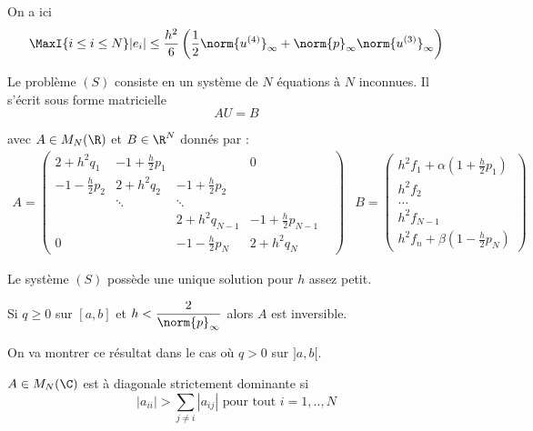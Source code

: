     \begin{remark}
        On a ici 
        \[
            \MaxI{i\leq i \leq N} |e_i| \leq \dfrac{h^2}{6} \left( \frac{1}{2}
            \norm{u^{(4)}}_\infty + \norm{p}_\infty \norm{u^{(3)}}_\infty \right)
        \]

        Le problème $(S)$ consiste en un système de $N$ équations à $N$ inconnues. Il s'écrit sous forme matricielle
        \[
            AU = B
        \]
        
        avec $A \in M_N(\R)$ et $B \in \R^N$ donnés par :
        \[
            \begin{array}{cc}
                A =
                \begin{pmatrix}
                    2 + h^2 q_1 & -1 + \frac{h}{2}p_1 & & 0\\
                    -1 - \frac{h}{2}p_2 & 2 + h^2 q_2 & -1 + \frac{h}{2}p_2 & \\
                    & \ddots & \ddots & & \\
                    & & 2 + h^2 q_{N-1} & -1 + \frac{h}{2}p_{N-1} \\
                    0 & & -1 - \frac{h}{2}p_N & 2 + h^2 q_N
                \end{pmatrix}
                &
                B =
                \begin{pmatrix}
                    h^2 f_1 + \alpha (1 + \frac{h}{2}p_1) \\
                    h^2 f_2 \\
                    \hdots \\
                    h^2 f_{N-1} \\
                    h^2 f_n + \beta (1 - \frac{h}{2} p_N)
                \end{pmatrix}
            \end{array}
        \]

        Le système $(S)$ possède une unique solution pour $h$ assez petit.
    \end{remark}

    \begin{ftheo}
        Si $q \geq 0$ sur $[a,b]$ et $h < \dfrac{2}{\norm{p}_\infty}$ alors
        $A$ est inversible.
        \label{th:1-pbvp-Ainv}
    \end{ftheo}

On va montrer ce résultat dans le cas où $q > 0$ sur $]a,b[$.

    \begin{fdef}
        $A \in M_N(\C)$ est à diagonale strictement dominante si
        \[
            |a_{ii}| > \sum_{j \ne i} |a_{ij}| \text{ pour tout $i=1,..,N$}
        \]
    \end{fdef}

